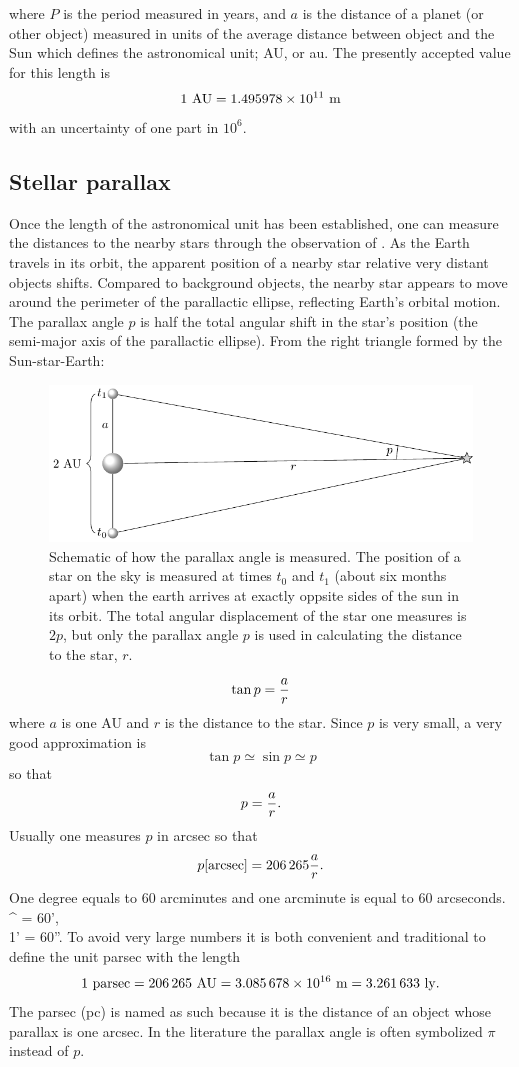 where $P$ is the period measured in years, and $a$ is the distance of a planet (or other object) 
measured in units of the average distance between object and the Sun which defines the 
astronomical unit; AU, or au. The presently accepted value for this length is
\[ 1~{\rm AU}=1.495978\times 10^{11}~{\rm m} \]
with an uncertainty of one part in $10^6$.

\subsection{Stellar parallax}

Once the length of the astronomical unit has been established, one can measure the distances to the nearby stars
through the observation of {}. As the Earth travels in its orbit, the apparent
position of a nearby star relative very distant objects shifts. Compared to background objects,
the nearby star appears to move around the perimeter of the parallactic ellipse, reflecting
Earth's orbital motion. The parallax angle $p$ is half the total angular shift in the star's
position (the semi-major axis of the parallactic ellipse). From the right triangle formed by the
Sun-star-Earth:
\begin{figure}[htpb]
	\centering
%	
	\includegraphics[width=\textwidth]{parallax-illustration.pdf}
	\caption{Schematic of how the parallax angle is measured. The position of a star on the
	sky is measured at times $t_0$ and $t_1$ (about six months apart) when the earth arrives
	at exactly oppsite sides of the sun in its orbit. The total angular displacement of the
	star one
	measures is $2p$, but only the parallax angle $p$ is used in calculating the distance to
	the star, $r$.}
	\label{fig:parallax-illustration}
\end{figure}
\[ \tan p={a\over r} \]
where $a$ is one AU and $r$ is the distance to the star. Since $p$ is very small, a very good 
approximation is \[\tan p\simeq\sin p\simeq p\] so that \[ p={a\over r}.\]
Usually one measures
$p$ in arcsec so that 
\[ p [{\rm arcsec}]=206\,265{a\over r}. \]
One degree equals to 60 arcminutes and one arcminute is equal to 60
arcseconds.
^{\circ} = 60', \\
	1' = 60''.
\eua
To avoid very large numbers it is both convenient and traditional to define the unit parsec with 
the length
\[ 1~{\rm parsec}=206\,265~{\rm AU}=3.085\,678\times 10^{16}~{\rm m}=3.261\,633~{\rm ly}. \]
The parsec (pc) is named as such because it is the distance of an object whose parallax is one arcsec. 
In the literature the parallax angle is often symbolized $\pi$ instead of $p$.

